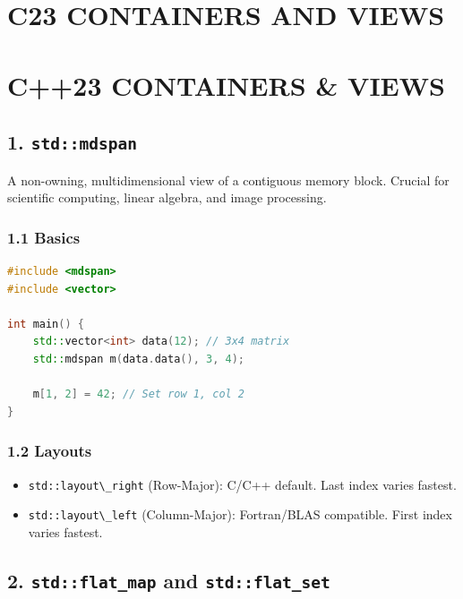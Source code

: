 \hypertarget{c23-containers-and-views}{%
\chapter{C23 CONTAINERS AND VIEWS}\label{c23-containers-and-views}}

\hypertarget{c23-containers-views}{%
\chapter{C++23 CONTAINERS \& VIEWS}\label{c23-containers-views}}

\hypertarget{stdmdspan}{%
\section{\texorpdfstring{1.
\texttt{std::mdspan}}{1. std::mdspan}}\label{stdmdspan}}

A non-owning, multidimensional view of a contiguous memory block.
Crucial for scientific computing, linear algebra, and image processing.

\hypertarget{basics}{%
\subsection{1.1 Basics}\label{basics}}

\begin{lstlisting}[language={C++}]
#include <mdspan>
#include <vector>

int main() {
    std::vector<int> data(12); // 3x4 matrix
    std::mdspan m(data.data(), 3, 4);
    
    m[1, 2] = 42; // Set row 1, col 2
}
\end{lstlisting}

\hypertarget{layouts}{%
\subsection{1.2 Layouts}\label{layouts}}

\begin{itemize}
\tightlist
\item
  \passthrough{\lstinline!std::layout\_right!} (Row-Major): C/C++
  default. Last index varies fastest.
\item
  \passthrough{\lstinline!std::layout\_left!} (Column-Major):
  Fortran/BLAS compatible. First index varies fastest.
\end{itemize}

\hypertarget{stdflat_map-and-stdflat_set}{%
\section{\texorpdfstring{2. \texttt{std::flat\_map} and
\texttt{std::flat\_set}}{2. std::flat\_map and std::flat\_set}}\label{stdflat_map-and-stdflat_set}}

